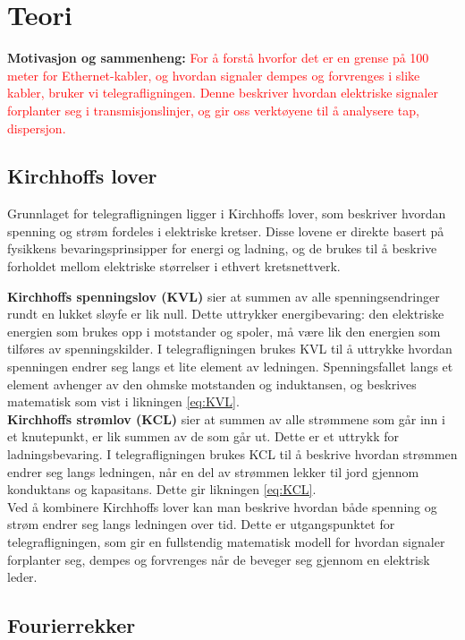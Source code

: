 
\section{Teori}

    \textbf{Motivasjon og sammenheng:} \textcolor{red}{For å forstå hvorfor det er en grense på 100 meter for Ethernet-kabler, og hvordan signaler dempes og forvrenges i slike kabler, bruker vi telegrafligningen. Denne beskriver hvordan elektriske signaler forplanter seg i transmisjonslinjer, og gir oss verktøyene til å analysere tap, dispersjon.}

\subsection{Kirchhoffs lover}

Grunnlaget for telegrafligningen ligger i Kirchhoffs lover, som beskriver hvordan spenning og strøm 
fordeles i elektriske kretser. Disse lovene er direkte basert på fysikkens bevaringsprinsipper 
for energi og ladning, og de brukes til å beskrive forholdet mellom elektriske størrelser i ethvert 
kretsnettverk.

\textbf{Kirchhoffs spenningslov (KVL)} sier at summen av alle spenningsendringer rundt en lukket 
sløyfe er lik null. Dette uttrykker energibevaring: den elektriske energien som brukes opp i motstander 
og spoler, må være lik den energien som tilføres av spenningskilder. I telegrafligningen brukes KVL 
til å uttrykke hvordan spenningen endrer seg langs et lite element av ledningen. Spenningsfallet 
langs et element avhenger av den ohmske motstanden og induktansen, og beskrives matematisk som vist i likningen \eqref{eq:KVL}.\\
\textbf{Kirchhoffs strømlov (KCL)} sier at summen av alle strømmene som går inn i et knutepunkt, 
er lik summen av de som går ut. Dette er et uttrykk for ladningsbevaring. I telegrafligningen brukes 
KCL til å beskrive hvordan strømmen endrer seg langs ledningen, når en del av strømmen lekker til jord 
gjennom konduktans og kapasitans. Dette gir likningen \eqref{eq:KCL}.\\

Ved å kombinere Kirchhoffs lover kan man beskrive hvordan både spenning og strøm endrer seg 
langs ledningen over tid. Dette er utgangspunktet for telegrafligningen, som gir 
en fullstendig matematisk modell for hvordan signaler forplanter seg, dempes og forvrenges når de beveger 
seg gjennom en elektrisk leder.

\subsection{Fourierrekker}

